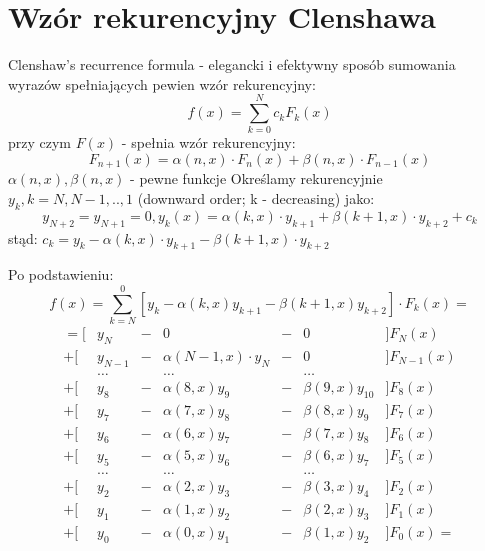 \section{Wzór rekurencyjny Clenshawa}
\begin{frame}{Clenshaw's recurrence formula}
	- elegancki i efektywny sposób sumowania wyrazów spełniających pewien wzór rekurencyjny:
    $$f(x) = \sum_{k=0}^{N}c_kF_k(x)$$
    przy czym $F(x)$ - spełnia wzór rekurencyjny:
    $$F_{n+1}(x) = \alpha(n,x) \cdot F_n(x) + \beta(n,x) \cdot F_{n-1}(x)$$
    $\alpha(n,x),\beta(n,x)$ - pewne funkcje\newline
    Określamy rekurencyjnie $y_k,k = N,N-1,..,1$ (downward order; k - decreasing) jako:
    $$y_{N+2}=y_{N+1} = 0, y_k(x) = \alpha(k,x) \cdot y_{k+1}+\beta(k+1,x) \cdot y_{k+2}+c_k$$
    stąd: $c_k = y_k - \alpha(k,x) \cdot y_{k+1} - \beta(k+1,x) \cdot y_{k+2}$ \newline
\end{frame} 
\begin{frame}
	Po podstawieniu:
    $$f(x) = \sum_{k=N}^{0}[y_k-\alpha(k,x)y_{k+1}-\beta(k+1,x)y_{k+2}] \cdot F_k(x) = $$
    $$\left.\begin{array}{rcccccl}
    	=[ & y_N & - & 0 & - & 0 & ] F_N(x) \\
        +[ &y_{N-1}& - & \alpha(N-1,x)\cdot y_N & - & 0 & ] F_{N-1}(x) \\
         & \ldots & & \ldots & & \ldots & \\
         +[ & y_8 & - & \alpha(8,x)y_9 & - & \beta(9,x)y_{10} & ] F_8(x) \\
		+[ & y_7 & - & \alpha(7,x)y_8 & - & \beta(8,x)y_9 & ] F_7(x) \\
        +[ & y_6 & - & \alpha(6,x)y_7 & - & \beta(7,x)y_8 & ] F_6(x) \\
        +[ & y_5 & - & \alpha(5,x)y_6 & - & \beta(6,x)y_7 & ] F_5(x) \\
         & \ldots & & \ldots & & \ldots & \\
		+[ & y_2 & - & \alpha(2,x)y_3 & - & \beta(3,x)y_4 & ] F_2(x) \\
        +[ & y_1 & - & \alpha(1,x)y_2 & - & \beta(2,x)y_3 & ] F_1(x) \\
        +[ & y_0 & - & \alpha(0,x)y_1 & - & \beta(1,x)y_2 & ] F_0(x) =
    \end{array}\right.$$
\end{frame}
